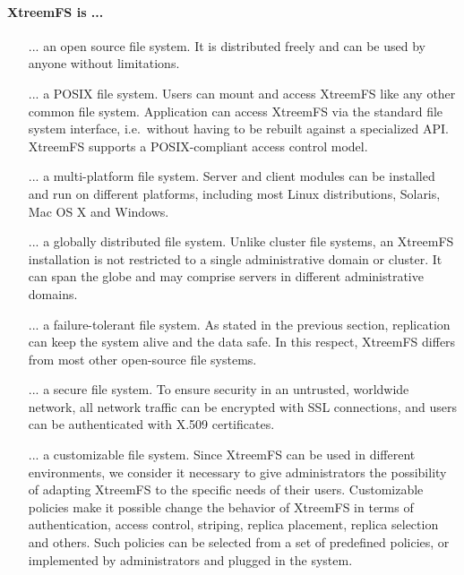 \documentclass[a4paper,10pt]{book}
\begin{document}
\paragraph{XtreemFS is ...}
\begin{itemize}
 \item [...] an open source file system. It is distributed freely and can be used by anyone without limitations.
 \item [...] a POSIX file system. Users can mount and access XtreemFS like any other common file system. Application can access XtreemFS via the standard file system interface, i.e.\ without having to be rebuilt against a specialized API. XtreemFS supports a POSIX-compliant access control model.
 \item [...] a multi-platform file system. Server and client modules can be installed and run on different platforms, including most Linux distributions, Solaris, Mac OS X and Windows.
 \item [...] a globally distributed file system. Unlike cluster file systems, an XtreemFS installation is not restricted to a single administrative domain or cluster. It can span the globe and may comprise servers in different administrative domains.
 \item [...] a failure-tolerant file system. As stated in the previous section, replication can keep the system alive and the data safe. In this respect, XtreemFS differs from most other open-source file systems.
 \item [...] a secure file system. To ensure security in an untrusted, worldwide network, all network traffic can be encrypted with SSL connections, and users can be authenticated with X.509 certificates.
 \item [...] a customizable file system. Since XtreemFS can be used in different environments, we consider it necessary to give administrators the possibility of adapting XtreemFS to the specific needs of their users. Customizable policies make it possible change the behavior of XtreemFS in terms of authentication, access control, striping, replica placement, replica selection and others. Such policies can be selected from a set of predefined policies, or implemented by administrators and plugged in the system.
\end{itemize}
\end{document}
